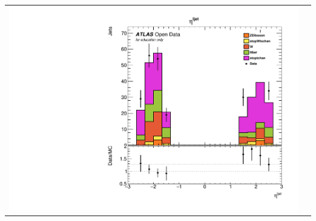 \documentclass[10pt]{beamer}
\begin{document}
\begin{frame}
\begin{center}
\begin{tabular}{cc}
		
			\includegraphics[scale=0.22]{qEta_cuts} 
			
			
			
		\end{tabular}
	\end{center}
\end{frame}
\end{document}
